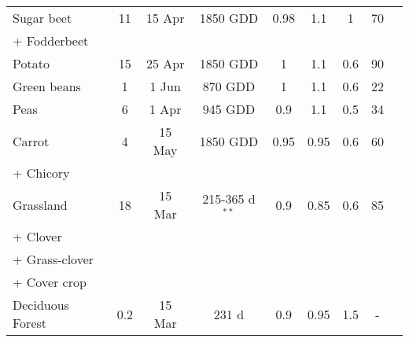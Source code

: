\begin{landscape}
\begin{table}[htbp]
{\begin{threeparttable}
\begin{tabular}{lrrrrrrrr}
Sugar beet & \multicolumn{1}{c}{11} & \multicolumn{1}{c}{15 Apr} & \multicolumn{1}{c}{1850 GDD} & \multicolumn{1}{c}{0.98} & \multicolumn{1}{c}{1.1} & \multicolumn{1}{c}{1} & \multicolumn{1}{c}{70} & \multicolumn{1}{c}{\textcite{vanuytrecht2015}} \\
      + Fodderbeet &       &       &       &       &       &       &       &  \\
Potato & \multicolumn{1}{c}{15} & \multicolumn{1}{c}{25 Apr} & \multicolumn{1}{c}{1850 GDD} & \multicolumn{1}{c}{1} & \multicolumn{1}{c}{1.1} & \multicolumn{1}{c}{0.6} & \multicolumn{1}{c}{90} & \multicolumn{1}{c}{\textcite{vanuytrecht2015}} \\
Green beans & \multicolumn{1}{c}{1} & \multicolumn{1}{c}{1 Jun} & \multicolumn{1}{c}{870 GDD} & \multicolumn{1}{c}{1} & \multicolumn{1}{c}{1.1} & \multicolumn{1}{c}{0.6} & \multicolumn{1}{c}{22} & \multicolumn{1}{c}{\textcite{vanuytrecht2013}} \\
Peas  & \multicolumn{1}{c}{6} & \multicolumn{1}{c}{1 Apr} & \multicolumn{1}{c}{945 GDD} & \multicolumn{1}{c}{0.9} & \multicolumn{1}{c}{1.1} & \multicolumn{1}{c}{0.5} & \multicolumn{1}{c}{34} & \multicolumn{1}{c}{\textcite{paredes2013}} \\
Carrot & \multicolumn{1}{c}{4} & \multicolumn{1}{c}{15 May} & \multicolumn{1}{c}{1850 GDD} & \multicolumn{1}{c}{0.95} & \multicolumn{1}{c}{0.95} & \multicolumn{1}{c}{0.6} & \multicolumn{1}{c}{60} & \multicolumn{1}{c}{\textcite{allen1998,vanuytrecht2013}} \\
      + Chicory &       &       &       &       &       &       &       &  \\
Grassland & \multicolumn{1}{c}{18} & \multicolumn{1}{c}{15 Mar} & \multicolumn{1}{c}{215-365 \si{d}$^{\ast\ast}$} & \multicolumn{1}{c}{0.9} & \multicolumn{1}{c}{0.85} & \multicolumn{1}{c}{0.6} & \multicolumn{1}{c}{85} & \multicolumn{1}{c}{\textcite{allen1998}} \\
      + Clover &       &       &       &       &       &       &       &  \\
      + Grass-clover  &       &       &       &       &       &       &       &  \\
      + Cover crop &       &       &       &       &       &       &       &  \\
Deciduous Forest & \multicolumn{1}{c}{0.2} & \multicolumn{1}{c}{15 Mar} & \multicolumn{1}{c}{231 \si{d}} & \multicolumn{1}{c}{0.9} & \multicolumn{1}{c}{0.95} & \multicolumn{1}{c}{1.5} & \multicolumn{1}{c}{-} & \multicolumn{1}{c}{\textcite{allen1998}} \\

\end{tabular}
\end{threeparttable}}
\end{table}
\end{landscape}
